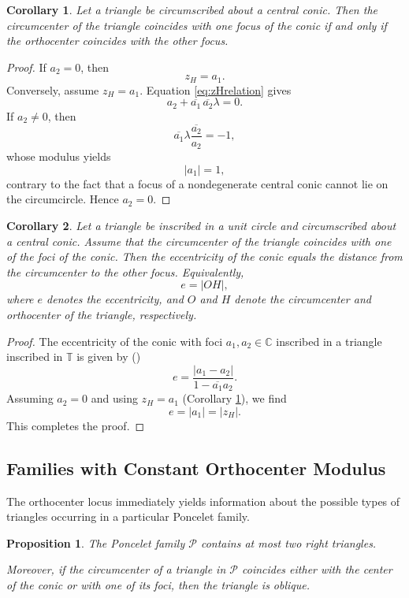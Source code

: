 \documentclass[11pt,reqno]{amsart}
\newtheorem{proposition}{Proposition}[section]
\newtheorem{corollary}{Corollary}[section]
\theoremstyle{definition}
\numberwithin{equation}{section}
\begin{document}
\begin{corollary}\label{cor:focusorthocenter}
Let a triangle be circumscribed about a central conic. Then the circumcenter of the triangle coincides with one focus of the conic if and only if the orthocenter coincides with the other
focus.
\end{corollary}

\begin{proof}
If $a_2=0$, then
\[
z_H=a_1.
\]
Conversely, assume $z_H=a_1$. Equation
\eqref{eq:zHrelation} gives
\[
a_2+\overline{a_1}\,\overline{a_2}\lambda=0.
\]
If $a_2\neq0$, then
\[
\overline{a_1}\lambda\frac{\overline{a_2}}{a_2}=-1,
\]
whose modulus yields
\[
|a_1|=1,
\]
contrary to the fact that a focus of a nondegenerate central conic
cannot lie on the circumcircle. Hence $a_2=0$.
\end{proof}

\begin{corollary}\label{cor:eccen}
Let a triangle be inscribed in a unit circle and circumscribed about a central conic. Assume that the circumcenter of the triangle coincides with one of the foci of the conic. Then the eccentricity of the conic equals the distance from the circumcenter to the other focus. Equivalently,
\[
e=|OH|,
\]
where $e$ denotes the eccentricity, and $O$ and $H$ denote the circumcenter and orthocenter of the triangle, respectively.
\end{corollary}

\begin{proof}
The eccentricity of the conic with foci $a_1,a_2 \in \mathbb C$ inscribed in a triangle inscribed in $\mathbb T$ is given by (\cite[Corollary 1]{Murad2026b})
\[
e=\frac{|a_1-a_2|}{1-\overline{a_1}a_2}.
\]
Assuming $a_2=0$ and using $z_H=a_1$ (Corollary \ref{cor:focusorthocenter}), we find
\[
e=|a_1|=|z_H|.
\]
This completes the proof.
\end{proof}

\subsection{Families with Constant Orthocenter Modulus}

The orthocenter locus immediately yields information about the
possible types of triangles occurring in a particular Poncelet family.

\begin{proposition}\label{prop:obltri}
The Poncelet family $\mathcal P$ contains at most two right triangles.

Moreover, if the circumcenter of a triangle in $\mathcal P$ coincides either with the center of the conic or with one of its foci, then the triangle is oblique.
\end{proposition}
\end{document}
